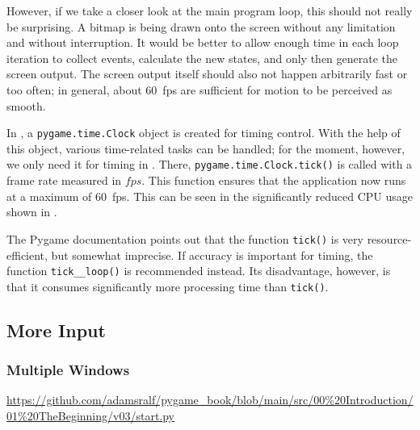 
However, if we take a closer look at the main program loop, this should not really be surprising. A bitmap is being drawn onto the screen without any limitation and without interruption. It would be better to allow enough time in each loop iteration to collect events, calculate the new states, and only then generate the screen output.
The screen output itself should also not happen arbitrarily fast or too often; in general, about \SI{60}{\gls{fps}} are sufficient for motion to be perceived as smooth.


In , a \texttt{pygame.time.Clock} object is created for timing control. With the help of this object, various time-related tasks can be handled; for the moment, however, we only need it for timing in . There, \texttt{pygame.time.Clock.\-tick()} is called with a frame rate measured in $fps$. This function ensures that the application now runs at a maximum of \SI{60}{fps}. This can be seen in the significantly reduced CPU usage shown in
.

\begin{hintbox}[Hint]
	The Pygame documentation points out that the function \texttt{tick()} is very resource-efficient, but somewhat imprecise. If accuracy is important for timing, the function \texttt{tick\_\_loop()} is recommended instead. Its disadvantage, however, is that it consumes significantly more processing time than \texttt{tick()}.
\end{hintbox}


\newpage
\subsection{More Input}
\subsubsection{Multiple Windows}\label{secMultipleWindows}
\begin{diskbox}
	\url{https://github.com/adamsralf/pygame_book/blob/main/src/00%20Introduction/01%20TheBeginning/v03/start.py}
\end{diskbox}

